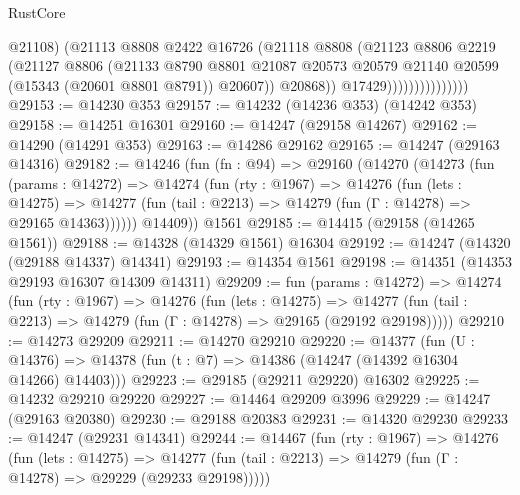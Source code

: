 \begin{lexlean}{RustCore}
\begin{coremodule}
                                  @21108)
                                (@21113
                                  @8808
                                  @2422
                                  @16726
                                  (@21118
                                    @8808
                                    (@21123
                                      @8806
                                      @2219
                                      (@21127
                                        @8806
                                        (@21133
                                          @8790
                                          @8801
                                          @21087
                                          @20573
                                          @20579
                                          @21140
                                          @20599
                                          (@15343 (@20601 @8801 @8791))
                                          @20607))
                                      @20868))
                                  @17429)))))))))))))))
@29153 := @14230 @353
@29157 := @14232 (@14236 @353) (@14242 @353)
@29158 := @14251 @16301
@29160 := @14247 (@29158 @14267)
@29162 := @14290 (@14291 @353)
@29163 := @14286 @29162
@29165 := @14247 (@29163 @14316)
@29182 := @14246
    (fun (fn : @94) =>
    @29160
      (@14270
        (@14273
          (fun (params : @14272) =>
          @14274
            (fun (rty : @1967) =>
            @14276
              (fun (lets : @14275) =>
              @14277 (fun (tail : @2213) => @14279 (fun (Γ : @14278) => @29165 @14363))))))
        @14409))
    @1561
@29185 := @14415 (@29158 (@14265 @1561))
@29188 := @14328 (@14329 @1561) @16304
@29192 := @14247 (@14320 (@29188 @14337) @14341)
@29193 := @14354 @1561
@29198 := @14351 (@14353 @29193 @16307 @14309 @14311)
@29209 := fun (params : @14272) =>
  @14274
    (fun (rty : @1967) =>
    @14276
      (fun (lets : @14275) =>
      @14277 (fun (tail : @2213) => @14279 (fun (Γ : @14278) => @29165 (@29192 @29198)))))
@29210 := @14273 @29209
@29211 := @14270 @29210
@29220 := @14377
    (fun (U : @14376) => @14378 (fun (t : @7) => @14386 (@14247 (@14392 @16304 @14266) @14403)))
@29223 := @29185 (@29211 @29220) @16302
@29225 := @14232 @29210 @29220
@29227 := @14464 @29209 @3996
@29229 := @14247 (@29163 @20380)
@29230 := @29188 @20383
@29231 := @14320 @29230
@29233 := @14247 (@29231 @14341)
@29244 := @14467
    (fun (rty : @1967) =>
    @14276
      (fun (lets : @14275) =>
      @14277 (fun (tail : @2213) => @14279 (fun (Γ : @14278) => @29229 (@29233 @29198)))))

\end{coremodule}
\end{lexlean}
